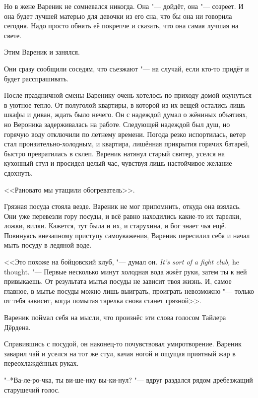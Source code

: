 Но в жене Вареник не сомневался никогда.
Она "--- дойдёт, она "--- созреет.
И она будет лучшей матерью для девочки из его сна, что бы она ни говорила сегодня.
Надо просто обнять её покрепче и сказать, что она самая лучшая на свете.

Этим Вареник и занялся.

\asterism

\textspace

\label{Sun_2012_06_10}

Они сразу сообщили соседям, что съезжают "--- на случай, если кто-то придёт и будет расспрашивать.

После праздничной смены Варенику очень хотелось по приходу домой окунуться в уютное тепло.
От полуголой квартиры, в которой из их вещей остались лишь шкафы и диван, ждать было нечего.
Он с надеждой думал о жёниных объятиях, но Вероника задерживалась на работе.
Следующей надеждой был душ, но горячую воду отключили по летнему времени.
Погода резко испортилась, ветер стал пронзительно-холодным, и квартира, лишённая прикрытия горячих батарей, быстро превратилась в склеп.
Вареник натянул старый свитер, уселся на кухонный стул и просидел целый час, чувствуя лишь настойчивое желание сдохнуть.

<<Рановато мы утащили обогреватель>>.

Грязная посуда стояла везде.
Вареник не мог припомнить, откуда она взялась.
Они уже перевезли гору посуды, и всё равно находились какие-то их тарелки, ложки, вилки.
Кажется, тут была и их, и старухина, и бог знает чья ещё.
Повинуясь внезапному приступу самоуважения, Вареник пересилил себя и начал мыть посуду в ледяной воде.

{<<Это похоже на бойцовский клуб, "--- думал он.}
{\textit{It's sort of a fight club,} he thought.}
"--- Первые несколько минут холодная вода жжёт руки, затем ты к ней привыкаешь.
От результата мытья посуды не зависит твоя жизнь.
И, самое главное, в мытье посуды можно лишь выиграть, проиграть невозможно "--- только от тебя зависит, когда помытая тарелка снова станет грязной>>.

Вареник поймал себя на мысли, что произнёс эти слова голосом Тайлера Дёрдена.

Справившись с посудой, он наконец-то почувствовал умиротворение.
Вареник заварил чай и уселся на тот же стул, качая ногой и ощущая приятный жар в переохлаждённых руках.

"--*Ва-ле-ро-чка, ты ви-ше-нку вы-ки-нул? "--- вдруг раздался рядом дребезжащий старушечий голос.

